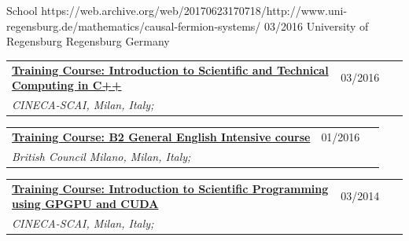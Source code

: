 \documentclass[a4paper]{article}
\newcommand{\longvoice}[8]{
	\begin{tabular}{p{0.83\linewidth} p{0.17\linewidth} }
		\textbf{\href{#3}{#2: #1}} & #4 
		\\ 
		\textit{#5, #6, #7;} & {\small\emph{#8}}
	\end{tabular}
	\vspace{.5em}
}
\begin{document}
		{School}
		{https://web.archive.org/web/20170623170718/http://www.uni-regensburg.de/mathematics/causal-fermion-systems/}
		{03/2016}
		{University of Regensburg}
		{Regensburg}
		{Germany}
		{}
	\longvoice{Introduction to Scientific and Technical Computing in C++}
		{Training Course}
		{https://web.archive.org/save/http://www.hpc.cineca.it/content/introduction-object-oriented}
		{03/2016}
		{CINECA-SCAI}
		{Milan}
		{Italy}
		{}
	\longvoice{B2 General English Intensive course}
		{Training Course}
		{https://www.britishcouncil.it/en/english/courses-adults/general}
		{01/2016}
		{British Council Milano}
		{Milan}
		{Italy}
		{}
	\longvoice{Introduction to Scientific Programming using GPGPU and CUDA}
		{Training Course}
		{https://web.archive.org/web/20170623171128/http://www.hpc.cineca.it/content/introduction-to-gpu}
		{03/2014}
		{CINECA-SCAI}
		{Milan}
		{Italy}
		{}
\end{document}
